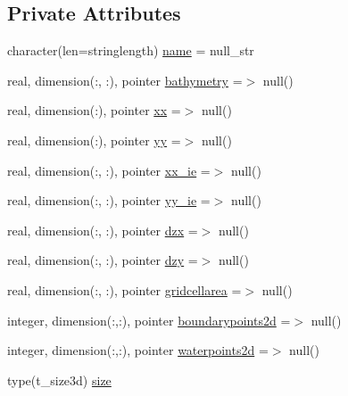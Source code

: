 \subsection*{Private Attributes}
\begin{DoxyCompactItemize}
\item 
character(len=stringlength) \mbox{\hyperlink{structmodulelagrangianglobal_1_1t__eulermodel_a4f4fce550ac9f8f6ee5ca4e6c8ca0e45}{name}} = null\+\_\+str
\item 
real, dimension(\+:, \+:), pointer \mbox{\hyperlink{structmodulelagrangianglobal_1_1t__eulermodel_acad0748e83d02b0c2feb27648fc7f147}{bathymetry}} =$>$ null()
\item 
real, dimension(\+:), pointer \mbox{\hyperlink{structmodulelagrangianglobal_1_1t__eulermodel_a6c37cd26ede6191769ad1488a82fcf38}{xx}} =$>$ null()
\item 
real, dimension(\+:), pointer \mbox{\hyperlink{structmodulelagrangianglobal_1_1t__eulermodel_a47989ec344030fe545f4f237060179fa}{yy}} =$>$ null()
\item 
real, dimension(\+:, \+:), pointer \mbox{\hyperlink{structmodulelagrangianglobal_1_1t__eulermodel_af2ef1ea37c6731c5109e67af24038493}{xx\+\_\+ie}} =$>$ null()
\item 
real, dimension(\+:, \+:), pointer \mbox{\hyperlink{structmodulelagrangianglobal_1_1t__eulermodel_a53089715e3b13c1de276fbb1bd0e9aa3}{yy\+\_\+ie}} =$>$ null()
\item 
real, dimension(\+:, \+:), pointer \mbox{\hyperlink{structmodulelagrangianglobal_1_1t__eulermodel_a3d81b90a8ae51ce1c0ad188810ca0824}{dzx}} =$>$ null()
\item 
real, dimension(\+:, \+:), pointer \mbox{\hyperlink{structmodulelagrangianglobal_1_1t__eulermodel_aecc961a4cf933d15837b1191f0c99fac}{dzy}} =$>$ null()
\item 
real, dimension(\+:, \+:), pointer \mbox{\hyperlink{structmodulelagrangianglobal_1_1t__eulermodel_a3589432c47f81b830a3fadf9d09cdb42}{gridcellarea}} =$>$ null()
\item 
integer, dimension(\+:,\+:), pointer \mbox{\hyperlink{structmodulelagrangianglobal_1_1t__eulermodel_ad956015ee7a522c8e0eee51e3cb30b9d}{boundarypoints2d}} =$>$ null()
\item 
integer, dimension(\+:,\+:), pointer \mbox{\hyperlink{structmodulelagrangianglobal_1_1t__eulermodel_a76d4da86de207c4456b80b3703258de9}{waterpoints2d}} =$>$ null()
\item 
type(t\+\_\+size3d) \mbox{\hyperlink{structmodulelagrangianglobal_1_1t__eulermodel_ae3548bebbc2381cdc10c3c4c4fadfdfe}{size}}

\end{DoxyCompactItemize}
